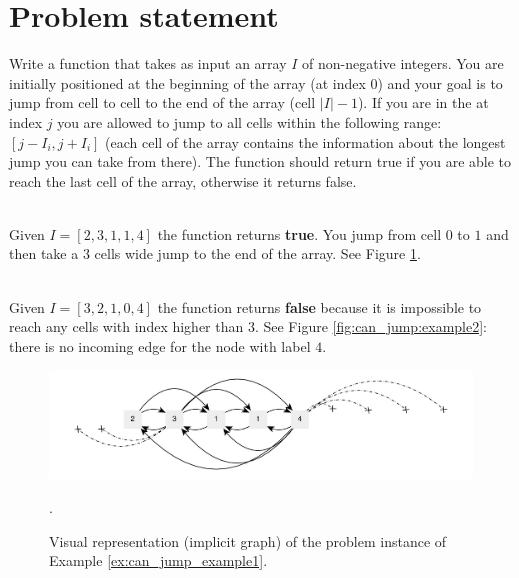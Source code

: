 \section{Problem statement}
\begin{exercise}
Write a function that takes as input  an array $I$ of non-negative integers. You are initially
positioned at the beginning of the array (at index $0$) and your goal is to jump from cell to cell
to the end of the array (cell $|I|-1$). If you are in the at index $j$ you are allowed to jump to
all cells within the following range: $[j-I_i,j+I_i]$ (each cell of the array contains the
information about the longest jump you can take from there). The function should return true if you
are able to reach the last cell of the array, otherwise it returns false.

	\begin{example}
		\hfill \\
		Given  $I=[2,3,1,1,4]$ the function returns \textbf{true}. You jump from cell $0$ to $1$ and
		then take a $3$ cells wide jump to the end of the array. See Figure
		\ref{fig:can_jump:example1}.
		\label{ex:can_jump_example1}
	\end{example}

	\begin{example}
		\hfill \\
		Given $I=[3,2,1,0,4]$ the function returns \textbf{false} because it is impossible to reach
		any cells with index higher than $3$. See Figure \ref{fig:can_jump:example2}: there is no
		incoming edge for the node with label $4$.
		\label{ex:can_jump_example2}
	\end{example}
\end{exercise}

\begin{figure}
	\centering
	\includegraphics[width=\textwidth]{sources/can_jump/images/can_jump_example1}
	\caption[Implicit graph for the Example \ref{ex:can_jump_example1}.]
	{Visual representation (implicit graph) of the problem instance of Example
	\ref{ex:can_jump_example1}.}.
	\label{fig:can_jump:example1}
\end{figure}

